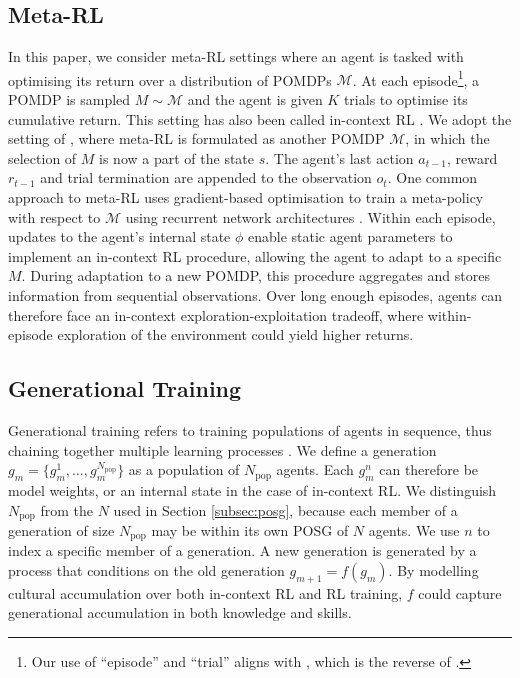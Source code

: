 \documentclass{article}
\begin{document}
\subsection{Meta-RL}
In this paper, we consider meta-RL settings where an agent is tasked with optimising its return over a distribution of POMDPs $\mathcal{M}$. At each episode\footnote{Our use of ``episode'' and ``trial'' aligns with \cite{Bauer23}, which is the reverse of \cite{Duan16}.}, a POMDP is sampled $M \sim \mathcal{M}$ and the agent is given $K$ trials to optimise its cumulative return. This setting has also been called in-context RL \citep{Laskin22}. We adopt the setting of \cite{ni21}, where meta-RL is formulated as another POMDP $\mathcal{M}$, in which the selection of $M$ is now a part of the state $s$. The agent's last action $a_{t-1}$, reward $r_{t-1}$ and trial termination are appended to the observation $o_t$.
One common approach to meta-RL uses gradient-based optimisation to train a meta-policy with respect to $\mathcal{M}$ using recurrent network architectures  \citep{Duan16, wang2016learning}. Within each episode, updates to the agent's internal state $\phi$ enable static agent parameters to implement an in-context RL procedure, allowing the agent to adapt to a specific $M$. During adaptation to a new POMDP, this procedure aggregates and stores information from sequential observations. Over long enough episodes, agents can therefore face an in-context exploration-exploitation tradeoff, where within-episode exploration of the environment could yield higher returns.
\subsection{Generational Training}
\label{subsec:gen_train}
Generational training refers to training populations of agents in sequence, thus chaining together multiple learning processes \citep{Stooke21}. We define a generation $g_m = \{ g^1_m, \dots, g^{N_\text{pop}}_m \}$ as a population of $N_\text{pop}$ agents. Each $g^n_m$ can therefore be model weights, or an internal state in the case of in-context RL. We distinguish $N_\text{pop}$ from the $N$ used in Section \ref{subsec:posg}, because each member of a generation of size $N_\text{pop}$ may be within its own POSG of $N$ agents. We use $n$ to index a specific member of a generation. A new generation is generated by a process that conditions on the old generation $g_{m+1} = f(g_{m})$. By modelling cultural accumulation over both in-context RL and RL training, $f$ could capture generational accumulation in both knowledge and skills.
\end{document}
